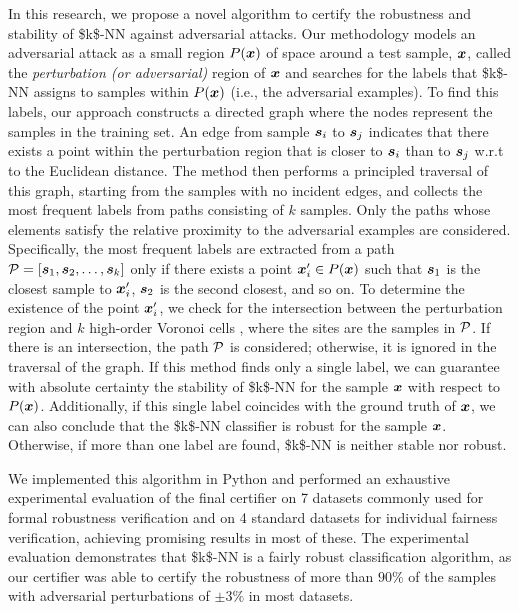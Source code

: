 In this research, we propose a novel algorithm to certify the robustness and stability of \acs{$k$-NN} against adversarial attacks. Our methodology models an adversarial attack as a small region $P(\vinput)$ of space around a test sample, $\vinput$, called the \emph{perturbation (or adversarial)} region of $\vinput$ and searches for the labels that \acs{$k$-NN} assigns to samples within $P(\vinput)$ (i.e., the adversarial examples). To find this labels, our approach constructs a directed graph where the nodes represent the samples in the training set. An edge from sample $\sample[i]$ to $\sample[j]$ indicates that there exists a point within the perturbation region that is closer to $\sample[i]$ than to $\sample[j]$ w.r.t to the Euclidean distance. The method then performs a principled traversal of this graph, starting from the samples with no incident edges, and collects the most frequent labels from paths consisting of $k$ samples. Only the paths whose elements satisfy the relative proximity to the adversarial examples are considered. Specifically, the most frequent labels are extracted from a path $\vpath = [\sample[1], \sample[2], \ldots, \sample[k]]$ only if there exists a point $\x' \in P(\vinput)$ such that $\sample[1]$ is the closest sample to $\x'$, $\sample[2]$ is the second closest, and so on. To determine the existence of the point $\x'$, we check for the intersection between the perturbation region and $k$ high-order Voronoi cells \cite{high-order-voronoi}, where the sites are the samples in $\vpath$. If there is an intersection, the path $\vpath$ is considered; otherwise, it is ignored in the traversal of the graph. If this method finds only a single label, we can guarantee with absolute certainty the stability of \acs{$k$-NN} for the sample $\vinput$ with respect to $P(\vinput)$. Additionally, if this single label coincides with the ground truth of $\vinput$, we can also conclude that the \acs{$k$-NN} classifier is robust for the sample $\vinput$. Otherwise, if more than one label are found, \acs{$k$-NN} is neither stable nor robust.

We implemented this algorithm in Python and performed an exhaustive experimental evaluation of the final certifier on 7 datasets commonly used for formal robustness verification and on 4 standard datasets for individual fairness verification, achieving promising results in most of these. The experimental evaluation demonstrates that \acs{$k$-NN} is a fairly robust classification algorithm, as our certifier was able to certify the robustness of more than $90\%$ of the samples with adversarial perturbations of $\pm 3\%$ in most datasets.

